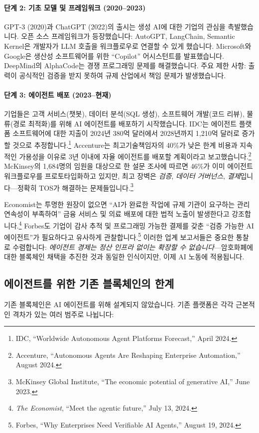 \documentclass[11pt]{article}
\begin{document}
\paragraph{단계 2: 기초 모델 및 프레임워크 (2020--2023)} GPT-3 (2020)과 ChatGPT (2022)의 출시는 생성 AI에 대한 기업의 관심을 촉발했습니다. 오픈 소스 프레임워크가 등장했습니다: AutoGPT, LangChain, Semantic Kernel은 개발자가 LLM 호출을 워크플로우로 연결할 수 있게 했습니다. Microsoft와 Google은 생산성 소프트웨어를 위한 ``Copilot'' 어시스턴트를 발표했습니다. DeepMind의 AlphaCode는 경쟁 프로그래밍 문제를 해결했습니다. 주요 제한 사항: 출력이 공식적인 검증을 받지 못하여 규제 산업에서 책임 문제가 발생했습니다.

\paragraph{단계 3: 에이전트 배포 (2023--현재)} 기업들은 고객 서비스(챗봇), 데이터 분석(SQL 생성), 소프트웨어 개발(코드 리뷰), 물류(경로 최적화)를 위해 AI 에이전트를 배포하기 시작했습니다. IDC는 에이전트 플랫폼 소프트웨어에 대한 지출이 2024년 380억 달러에서 2028년까지 1,210억 달러로 증가할 것으로 추정합니다.\footnote{IDC, ``Worldwide Autonomous Agent Platforms Forecast,'' April 2024.} Accenture는 최고기술책임자의 40\%가 낮은 한계 비용과 지속적인 가용성을 이유로 3년 이내에 자율 에이전트를 배포할 계획이라고 보고했습니다.\footnote{Accenture, ``Autonomous Agents Are Reshaping Enterprise Automation,'' August 2024.} McKinsey의 1,684명의 임원을 대상으로 한 설문 조사에 따르면 46\%가 이미 에이전트 워크플로우를 프로토타입화하고 있지만, 최고 장벽은 \emph{검증}, \emph{데이터 거버넌스}, \emph{결제}입니다---정확히 TOS가 해결하는 문제들입니다.\footnote{McKinsey Global Institute, ``The economic potential of generative AI,'' June 2023.}

Economist는 투명한 원장이 없으면 ``AI가 완료한 작업에 규제 기관이 요구하는 관리 연속성이 부족하여'' 금융 서비스 및 의료 배포에 대한 법적 노출이 발생한다고 강조합니다.\footnote{\emph{The Economist}, ``Meet the agentic future,'' July 13, 2024.} Forbes도 기업이 감사 추적 및 프로그래밍 가능한 결제를 갖춘 ``검증 가능한 AI 에이전트''가 필요하다고 유사하게 관찰합니다.\footnote{Forbes, ``Why Enterprises Need Verifiable AI Agents,'' August 19, 2024.} 이러한 업계 보고서들은 중요한 통찰로 수렴합니다: \emph{에이전트 경제는 정산 인프라 없이는 확장할 수 없습니다}---암호화폐에 대한 블록체인 채택을 추진한 것과 동일한 인식이지만, 이제 AI 노동에 적용됩니다.

\subsection{에이전트를 위한 기존 블록체인의 한계}
기존 블록체인은 AI 에이전트를 위해 설계되지 않았습니다. 기존 플랫폼은 각각 근본적인 격차가 있는 여러 범주로 나뉩니다:
\end{document}
